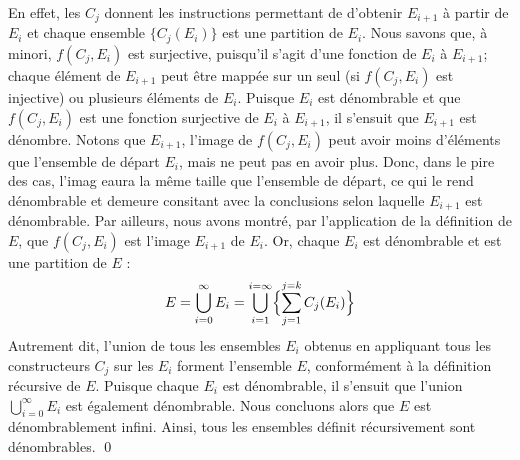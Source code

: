 \documentclass[16pt]{report}
\begin{document}
\begin{multicols*}{2}
\begin{Preuve}{}{}
            En effet, les $C_j$ donnent les instructions permettant de d'obtenir $E_{i+1}$ à partir 
            de $E_{i}$ et chaque ensemble $\{ C_j(E_i) \}$ est une partition de $E_i$. 
            Nous savons que, à minori, $f(C_j, E_i)$ est surjective, puisqu'il s'agit d'une fonction 
            de $E_i$ à $E_{i+1}$; chaque élément de $E_{i+1}$ peut être mappée sur un seul 
            (si $f(C_j, E_i)$ est injective) ou plusieurs éléments de $E_i$. Puisque $E_i$ est dénombrable 
            et que $f(C_j, E_i)$ est une fonction surjective de $E_i$ à $E_{i+1}$, il s'ensuit que 
            $E_{i+1}$ est dénombre. Notons que $E_{i+1}$, l'image de $f(C_j, E_i)$ peut avoir 
            moins d'éléments que l'ensemble de départ $E_i$, mais ne peut pas en avoir plus. Donc, dans le pire 
            des cas, l'imag eaura la même taille que l'ensemble de départ, ce qui le rend dénombrable et demeure 
            consitant avec la conclusions selon laquelle $E_{i+1}$ est dénombrable. Par ailleurs, 
            nous avons montré, par l'application de la définition de $E$, que 
            $f(C_j, E_i)$ est l'image $E_{i+1}$ de $E_i$. Or, chaque $E_i$ est dénombrable et est une partition 
            de $E$ : 
            \begin{align*}
                E = \bigcup\limits_{i=0}^{\infty}E_i = \bigcup\limits_{i=1}^{i=\infty} \Bigl\{ \sum_{j=1}^{j=k}C_j(E_i) \Bigr\}
            \end{align*}
            Autrement dit, l'union de tous les ensembles $E_i$ obtenus en appliquant tous les constructeurs 
            $C_j$ sur les $E_i$ forment l'ensemble $E$, conformément à la définition récursive de $E$. Puisque 
            chaque $E_i$ est dénombrable, il s'ensuit que l'union $\bigcup\limits_{i=0}^{\infty}E_i$ est également 
            dénombrable. Nous concluons alors que $E$ est dénombrablement infini. Ainsi, tous les 
            ensembles définit récursivement sont dénombrables. \qed 
        

            
           


            \end{Preuve}

            


\end{multicols*}
\end{document}
